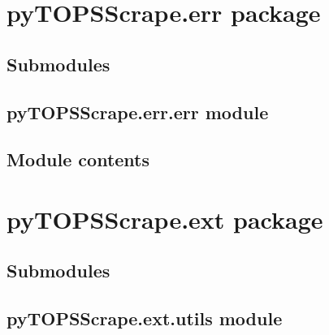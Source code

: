 \documentclass[letterpaper,10pt,english]{sphinxmanual}
\begin{document}
\chapter{pyTOPSScrape.err package}
\label{\detokenize{pyTOPSScrape.err:pytopsscrape-err-package}}\label{\detokenize{pyTOPSScrape.err::doc}}

\section{Submodules}
\label{\detokenize{pyTOPSScrape.err:submodules}}

\section{pyTOPSScrape.err.err module}
\label{\detokenize{pyTOPSScrape.err:module-pyTOPSScrape.err.err}}\label{\detokenize{pyTOPSScrape.err:pytopsscrape-err-err-module}}

\section{Module contents}
\label{\detokenize{pyTOPSScrape.err:module-pyTOPSScrape.err}}\label{\detokenize{pyTOPSScrape.err:module-contents}}

\chapter{pyTOPSScrape.ext package}
\label{\detokenize{pyTOPSScrape.ext:pytopsscrape-ext-package}}\label{\detokenize{pyTOPSScrape.ext::doc}}

\section{Submodules}
\label{\detokenize{pyTOPSScrape.ext:submodules}}

\section{pyTOPSScrape.ext.utils module}
\label{\detokenize{pyTOPSScrape.ext:module-pyTOPSScrape.ext.utils}}\label{\detokenize{pyTOPSScrape.ext:pytopsscrape-ext-utils-module}}
\end{document}
